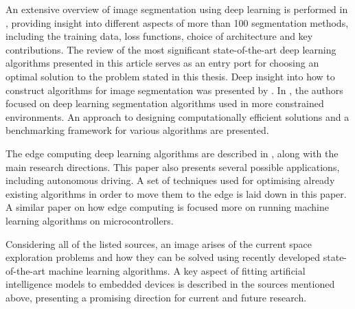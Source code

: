 \documentclass[a4paper,twoside,12pt]{book}
\begin{document}
An extensive overview of image segmentation using deep learning is performed in \cite{minaee2021image}, providing insight into different aspects of more than 100 segmentation methods, including the training data, loss functions, choice of architecture and key contributions. The review of the most significant state-of-the-art deep learning algorithms presented in this article serves as an entry port for choosing an optimal solution to the problem stated in this thesis. Deep insight into how to construct algorithms for image segmentation was presented by \cite{ghosh2019understanding}. In \cite{siam2018comparative}, the authors focused on deep learning segmentation algorithms used in more constrained environments. An approach to designing computationally efficient solutions and a benchmarking framework for various algorithms are presented.

The edge computing deep learning algorithms are described in \cite{vestias2020moving}, along with the main research directions. This paper also presents several possible applications, including autonomous driving. A set of techniques used for optimising already existing algorithms in order to move them to the edge is laid down in this paper. A similar paper on how edge computing is \cite{merenda2020edge} focused more on running machine learning algorithms on microcontrollers.

Considering all of the listed sources, an image arises of the current space exploration problems and how they can be solved using recently developed state-of-the-art machine learning algorithms. A key aspect of fitting artificial intelligence models to embedded devices is described in the sources mentioned above, presenting a promising direction for current and future research.

\end{document}
